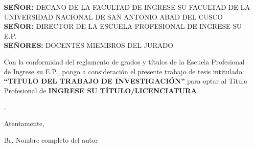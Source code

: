 \begin{presentacion}
\noindent
  \textbf{SEÑOR:} DECANO DE LA FACULTAD DE INGRESE SU FACULTAD DE LA UNIVERSIDAD NACIONAL DE SAN ANTONIO ABAD DEL CUSCO\\
  \textbf{SEÑOR:} DIRECTOR DE LA ESCUELA PROFESIONAL DE INGRESE SU E.P.\\
  \textbf{SEÑORES:} DOCENTES MIEMBROS DEL JURADO

\noindent
Con la conformidad del reglamento de grados y títulos de la Escuela Profesional de Ingrese su E.P., pongo a consideración el presente trabajo de tesis intitulado: \textbf{ ``TITULO DEL TRABAJO DE INVESTIGACIÓN''} para optar al Título Profesional de \textbf{INGRESE SU TÍTULO/LICENCIATURA}.

\noindent
\lipsum[1]

\noindent
\lipsum[1][1-3].


\begin{flushright}
  Atentamente,
  
  Br. Nombre completo del autor
\end{flushright}


\end{presentacion}
